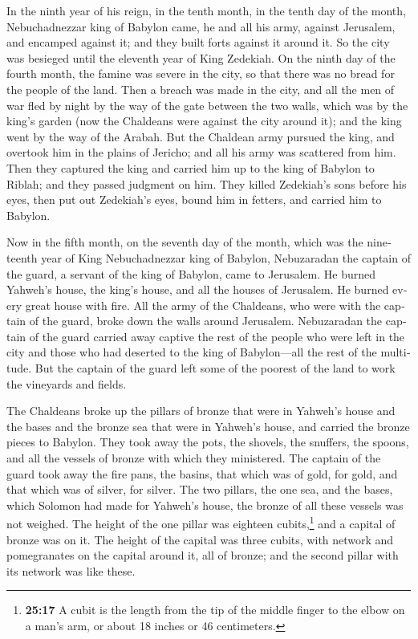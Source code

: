 \begin{paracol}{2}
\begin{otherlanguage}{english}
 In the ninth year of his reign, in the tenth month, in
the tenth day of the month, Nebuchadnezzar king of Babylon came, he and
all his army, against Jerusalem, and encamped against it; and they built
forts against it around it.  So the city was besieged
until the eleventh year of King Zedekiah.  On the ninth
day of the fourth month, the famine was severe in the city, so that
there was no bread for the people of the land.  Then a
breach was made in the city, and all the men of war fled by night by the
way of the gate between the two walls, which was by the king's garden
(now the Chaldeans were against the city around it); and the king went
by the way of the Arabah.  But the Chaldean army pursued
the king, and overtook him in the plains of Jericho; and all his army
was scattered from him.  Then they captured the king and
carried him up to the king of Babylon to Riblah; and they passed
judgment on him.  They killed Zedekiah's sons before his
eyes, then put out Zedekiah's eyes, bound him in fetters, and carried
him to Babylon.

 Now in the fifth month, on the seventh day of the month,
which was the nineteenth year of King Nebuchadnezzar king of Babylon,
Nebuzaradan the captain of the guard, a servant of the king of Babylon,
came to Jerusalem.  He burned Yahweh's house, the king's
house, and all the houses of Jerusalem. He burned every great house with
fire.  All the army of the Chaldeans, who were with the
captain of the guard, broke down the walls around Jerusalem.
 Nebuzaradan the captain of the guard carried away
captive the rest of the people who were left in the city and those who
had deserted to the king of Babylon---all the rest of the multitude.
 But the captain of the guard left some of the poorest of
the land to work the vineyards and fields.

 The Chaldeans broke up the pillars of bronze that were
in Yahweh's house and the bases and the bronze sea that were in Yahweh's
house, and carried the bronze pieces to Babylon.  They
took away the pots, the shovels, the snuffers, the spoons, and all the
vessels of bronze with which they ministered.  The
captain of the guard took away the fire pans, the basins, that which was
of gold, for gold, and that which was of silver, for silver.
 The two pillars, the one sea, and the bases, which
Solomon had made for Yahweh's house, the bronze of all these vessels was
not weighed.  The height of the one pillar was eighteen
cubits,\footnote{\textbf{25:17} A cubit is the length from the tip of
  the middle finger to the elbow on a man's arm, or about 18 inches or
  46 centimeters.} and a capital of bronze was on it. The height of the
capital was three cubits, with network and pomegranates on the capital
around it, all of bronze; and the second pillar with its network was
like these.


\end{otherlanguage}
\end{paracol}
